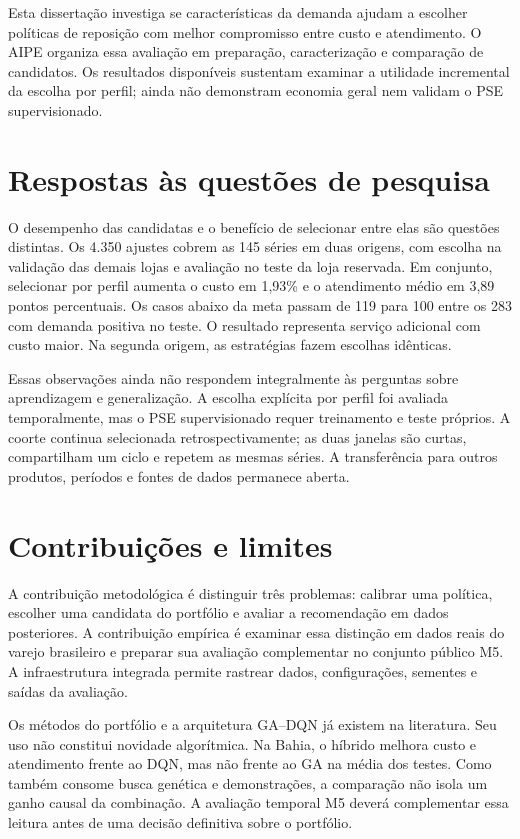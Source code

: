 
Esta dissertação investiga se características da demanda ajudam a escolher políticas de reposição com melhor compromisso entre custo e atendimento. O AIPE organiza essa avaliação em preparação, caracterização e comparação de candidatos. Os resultados disponíveis sustentam examinar a utilidade incremental da escolha por perfil; ainda não demonstram economia geral nem validam o PSE supervisionado.

\section{Respostas às questões de pesquisa}

O desempenho das candidatas e o benefício de selecionar entre elas são questões distintas. Os 4.350 ajustes cobrem as 145 séries em duas origens, com escolha na validação das demais lojas e avaliação no teste da loja reservada. Em conjunto, selecionar por perfil aumenta o custo em 1,93\% e o atendimento médio em 3,89 pontos percentuais. Os casos abaixo da meta passam de 119 para 100 entre os 283 com demanda positiva no teste. O resultado representa serviço adicional com custo maior. Na segunda origem, as estratégias fazem escolhas idênticas.

Essas observações ainda não respondem integralmente às perguntas sobre aprendizagem e generalização. A escolha explícita por perfil foi avaliada temporalmente, mas o PSE supervisionado requer treinamento e teste próprios. A coorte continua selecionada retrospectivamente; as duas janelas são curtas, compartilham um ciclo e repetem as mesmas séries. A transferência para outros produtos, períodos e fontes de dados permanece aberta.

\section{Contribuições e limites}

A contribuição metodológica é distinguir três problemas: calibrar uma política, escolher uma candidata do portfólio e avaliar a recomendação em dados posteriores. A contribuição empírica é examinar essa distinção em dados reais do varejo brasileiro e preparar sua avaliação complementar no conjunto público M5. A infraestrutura integrada permite rastrear dados, configurações, sementes e saídas da avaliação.

Os métodos do portfólio e a arquitetura GA--DQN já existem na literatura. Seu uso não constitui novidade algorítmica. Na Bahia, o híbrido melhora custo e atendimento frente ao DQN, mas não frente ao GA na média dos testes. Como também consome busca genética e demonstrações, a comparação não isola um ganho causal da combinação. A avaliação temporal M5 deverá complementar essa leitura antes de uma decisão definitiva sobre o portfólio.

